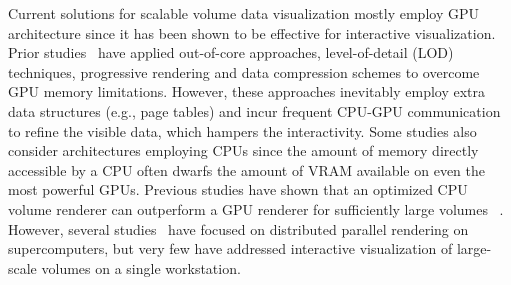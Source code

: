 Current solutions for scalable volume data visualization mostly employ GPU architecture
since it has been shown to be effective for interactive visualization. 
Prior studies~\cite{crassin2009gigavoxels,engel2011cera,hadwiger2008interactive} 
have applied out-of-core approaches, level-of-detail (LOD) techniques,
progressive rendering and data compression schemes to overcome GPU memory limitations. 
However, these approaches inevitably employ extra data structures (e.g., page tables)
and incur frequent CPU-GPU communication to refine the visible data, which hampers the interactivity. Some studies also consider architectures employing CPUs since the amount 
of memory directly accessible by a CPU often dwarfs the amount of VRAM available on even
the most powerful GPUs. Previous studies have shown that an optimized CPU volume renderer 
can outperform a GPU renderer for sufficiently large volumes ~\cite{smelyanskiy2009,knoll2011full,wald2017ospray}. However, several studies~\cite{childs2006scalable,peterka2008parallel,howison2012hybrid}
have focused on distributed parallel rendering on supercomputers, but very few have addressed interactive visualization of large-scale volumes on a single workstation.







